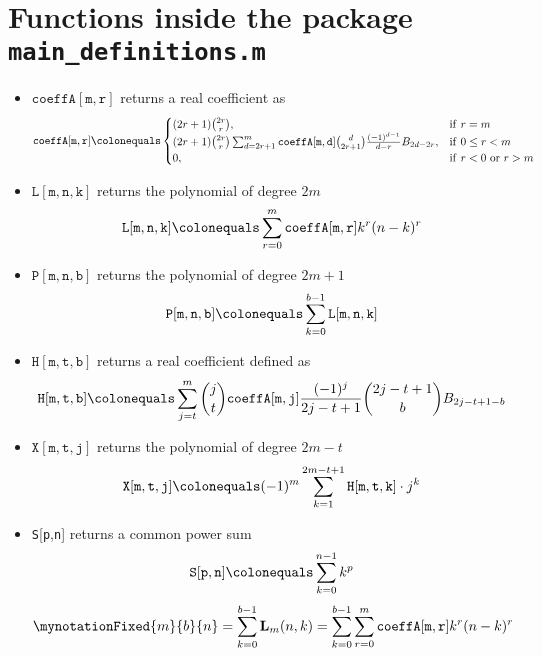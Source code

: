 \documentclass[12pt, letterpaper]{amsart}
\newenvironment{myitemize}
{ \begin{itemize}
    \setlength{\itemsep}{4pt}
    \setlength{\parskip}{4pt}
    \setlength{\parsep}{4pt}     }
{ \end{itemize}                  }
\newcommand \coeffA [3][coeffA]{\texttt{#1}[{\texttt{#2}},{\texttt{#3}}]}
\newcommand \coeffH [4][H]{\texttt{#1}[{\texttt{#2}},{\texttt{#3}},{\texttt{#4}}]}
\newcommand \polL [4][L]{\texttt{{#1}} [{\texttt{#2}},{\texttt{#3}},{\texttt{#4}}]}
\newcommand \polP [4][P]{\texttt{{#1}} [{\texttt{#2}},{\texttt{#3}},{\texttt{#4}}]}
\newcommand \coeffX [4][X]{\texttt{#1}[{\texttt{#2}},{\texttt{#3}},{\texttt{#4}}]}
\newcommand \commonPowSum [3][S]{\texttt{#1}[{\texttt{#2}},{\texttt{#3}}]}
\theoremstyle{definition}
\theoremstyle{remark}
\numberwithin{equation}{section}
\begin{document}
\section{Functions inside the package \texttt{main\_definitions.m}}
\begin{myitemize}
\item $\coeffA{m}{r}$ returns a real coefficient as
\begin{equation*}
\coeffA{m}{r} \colonequals
\begin{cases}
(2r+1)\binom{2r}{r}, & \mathrm{if } \ r=m \\
(2r+1)\binom{2r}{r} \sum_{d=2r+1}^{m} \coeffA{m}{d} \binom{d}{2r+1} \frac{(-1)^{d-1}}{d-r} B_{2d-2r}, & \mathrm{if } \ 0 \leq r < m \\
0, & \mathrm{if } \ r<0 \ \mathrm{or } \ r>m
\end{cases}
\end{equation*}
\item $\polL{m}{n}{k}$ returns the  polynomial of degree $2m$
\begin{equation*}
\polL{m}{n}{k} \colonequals \sum_{r=0}^{m} \coeffA{m}{r} k^r(n-k)^r
\end{equation*}
\item $\polP{m}{n}{b}$ returns the polynomial of degree $2m+1$
\begin{equation*}
\label{p_definition}
\polP{m}{n}{b} \colonequals \sum_{k=0}^{b-1} \polL{m}{n}{k}
\end{equation*}
\item $\coeffH{m}{t}{b}$ returns a real coefficient defined as
\begin{equation*}
\coeffH{m}{t}{b} \colonequals \sum_{j=t}^{m} \binom{j}{t} \coeffA{m}{j} \frac{(-1)^j}{2j-t+1} \binom{2j-t+1}{b} B_{2j-t+1-b}
\end{equation*}
\item $\coeffX{m}{t}{j}$ returns the polynomial of degree $2m-t$
\begin{equation*}
\coeffX{m}{t}{j} \colonequals (-1)^m \sum_{k=1}^{2m-t+1} \coeffH{m}{t}{k} \cdot j^k
\end{equation*}
\item \commonPowSum{p}{n} returns a common power sum
\begin{equation*}
\commonPowSum{p}{n} \colonequals \sum_{k=0}^{n-1} k^p
\end{equation*}
\begin{equation*}
\begin{split}
\mynotationFixed{m}{b}{n}
&=\sum_{k=0}^{b-1} \polynomL
 =\sum_{k=0}^{b-1} \sum_{r=0}^{m} \coeffA{m}{r} k^r(n-k)^r

\end{split}
\end{equation*}
\end{myitemize}
\end{document}
